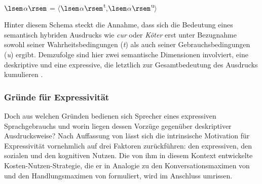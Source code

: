$\lsem$$\alpha$$\rsem$ = $\langle$$\lsem$$\alpha$$\rsem$\textsuperscript{t},$\lsem$$\alpha$$\rsem$\textsuperscript{u}$\rangle$ \medskip


\noindent Hinter diesem Schema steckt die Annahme, dass sich die Bedeutung eines semantisch hybriden Ausdrucks wie \textit{cur} oder \textit{Köter} erst unter Bezugnahme sowohl seiner Wahrheitsbedingungen (\textit{t}) als auch seiner Gebrauchsbedingungen (\textit{u}) ergibt. Demzufolge sind hier zwei semantische Dimensionen involviert, eine deskriptive und eine expressive, die letztlich zur Gesamtbedeutung des Ausdrucks kumulieren \citep[vgl.][13]{Gutzmann.2019a}.

\subsubsection{Gründe für Expressivität} \label{Auslöser}

Doch aus welchen Gründen bedienen sich Sprecher eines expressiven Sprachgebrauchs und worin liegen dessen Vorzüge gegenüber deskriptiver Ausdrucksweise? Nach Auffassung von \citet[187]{Kirschbaum.2002b} lässt sich die intrinsische Motivation für Expressivität vornehmlich auf drei Faktoren zurückführen: den expressiven, den sozialen und den kognitiven Nutzen. Die von ihm in diesem Kontext entwickelte Kosten-Nutzen-Strategie, die er in Analogie zu den Konversationsmaximen von \citet[]{Grice.1975} und den Handlungsmaximen von {\citet[]{Keller.1995}} formuliert, wird im Anschluss umrissen.


